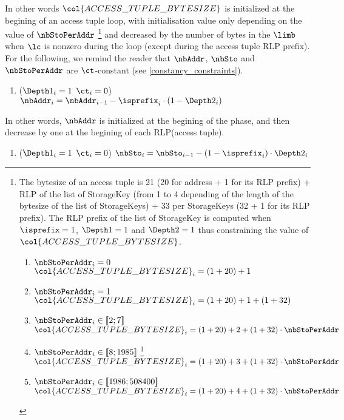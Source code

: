 In other words $\col{ACCESS\_TUPLE\_BYTESIZE}$ is initialized at the begining of an access tuple loop, with initialisation value only depending on the value of $\nbStoPerAddr$ 
				\footnote{The bytesize of an access tuple is 21 (20 for address + 1 for its RLP prefix) + RLP of the list of StorageKey (from 1 to 4 depending of the length of the bytesize of the list of StorageKeys) + 33 per StorageKeys (32 + 1 for its RLP prefix). The RLP prefix of the list of StorageKey is computed when $\isprefix = 1$, $\Depth 1 =1$ and $\Depth 2 = 1$ thus constraining the value of $\col{ACCESS\_TUPLE\_BYTESIZE}$.
					    \begin{enumerate}
							\item \If $\nbStoPerAddr_{i}=0$ \Then $\col{ACCESS\_TUPLE\_BYTESIZE}_{i}=(1+20) + 1$
							\item \If $\nbStoPerAddr_{i}=1$ \Then $\col{ACCESS\_TUPLE\_BYTESIZE}_{i}=(1+20) + 1 + (1+32)$
							\item \If $\nbStoPerAddr_{i} \in [\![ 2 ; 7 ]\!] $ \Then $\col{ACCESS\_TUPLE\_BYTESIZE}_{i}= (1+20) + 2 + (1+32) \cdot \nbStoPerAddr$
							\item \If $\nbStoPerAddr_{i} \in [\![ 8 ; 1985  ]\!]$ \footnote{In this case the bytesize of $\nbStoPerAddr$ RLP(StorageKey) is a two bytes integer.} \Then $\col{ACCESS\_TUPLE\_BYTESIZE}_{i}= (1+20) + 3 + (1+32) \cdot \nbStoPerAddr$
							\item \If $\nbStoPerAddr_{i} \in [\![ 1986 ; 508400]\!]$ \Then $\col{ACCESS\_TUPLE\_BYTESIZE}_{i}= (1+20) + 4 + (1+32) \cdot \nbStoPerAddr$
					    \end{enumerate}
						}
and decreased by the number of bytes in the $\limb$ when $\lc$ is nonzero during the loop (except during the access tuple RLP prefix).
\newline
For the following, we remind the reader that $\nbAddr$, $\nbSto$ and $\nbStoPerAddr$ are $\ct$-constant (see \ref{constancy_constraints}).
\begin{enumerate}[resume]
    \item \If ($\Depth1_{i}=1$ \et $\ct_{i}=0$) \Then $\nbAddr_{i} = \nbAddr_{i-1} - \isprefix_{i} \cdot (1 - \Depth2_{i})$
\end{enumerate}
In other words, $\nbAddr$ is initialized at the begining of the phase, and then decrease by one at the begining of each RLP(access tuple).
\begin{enumerate}[resume]    
    \item \If ($\Depth1_{i}=1$ \et $\ct_{i}=0$) \Then $\nbSto_{i} = \nbSto_{i-1} - (1- \isprefix_{i}) \cdot \Depth2_{i}$
\end{enumerate}
